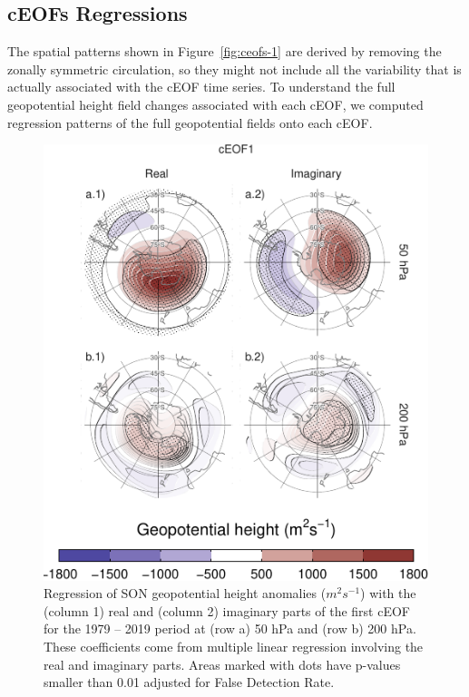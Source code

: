 \documentclass[smallextended]{svjour3}       %
\begin{document}
\hypertarget{regressions}{%
\subsection{cEOFs Regressions}\label{regressions}}

The spatial patterns shown in Figure~\ref{fig:ceofs-1} are derived by removing the zonally symmetric circulation, so they might not include all the variability that is actually associated with the cEOF time series.
To understand the full geopotential height field changes associated with each cEOF, we computed regression patterns of the full geopotential fields onto each cEOF.



\begin{figure}
\centering
\includegraphics{../figures/eof1-regr-gh-1.pdf}
\caption{\label{fig:eof1-regr-gh}Regression of SON geopotential height anomalies (\(m^2s^{-1}\)) with the (column 1) real and (column 2) imaginary parts of the first cEOF for the 1979 -- 2019 period at (row a) 50 hPa and (row b) 200 hPa. These coefficients come from multiple linear regression involving the real and imaginary parts. Areas marked with dots have p-values smaller than 0.01 adjusted for False Detection Rate.}
\end{figure}
\end{document}
